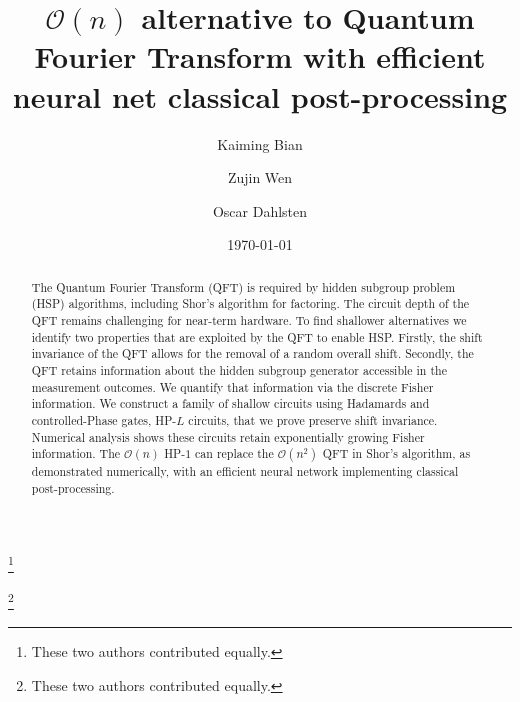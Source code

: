 \documentclass[reprint, aps, prl, superscriptaddress]{revtex4-2}
\begin{document}
\title{$\mathcal{O}(n)$ alternative to Quantum Fourier Transform with efficient neural net classical post-processing}


\author{Kaiming Bian}%
\thanks{These two authors contributed equally.}

\author{Zujin Wen}%
\thanks{These two authors contributed equally.}
\author{Oscar Dahlsten}
\date{\today}

\begin{abstract}
The Quantum Fourier Transform (QFT) is required by hidden subgroup problem (HSP) algorithms, including Shor's algorithm for factoring. The circuit depth of the QFT remains challenging for near-term hardware. To find shallower alternatives we identify two properties that are exploited by the QFT to enable HSP. Firstly, the shift invariance of the QFT allows for the removal of a random overall shift. Secondly, the QFT retains information about the hidden subgroup generator accessible in the measurement outcomes. We quantify that information via the discrete Fisher information. We construct a family of shallow circuits using Hadamards and controlled-Phase gates, HP-$L$ circuits, that we prove preserve shift invariance. Numerical analysis shows these circuits retain exponentially growing Fisher information. The $\mathcal{O}(n)$ HP-$1$ can replace the $\mathcal{O}(n^2)$ QFT in Shor's algorithm, as demonstrated numerically, with an efficient neural network implementing classical post-processing.  
\end{abstract}

\maketitle
\end{document}
